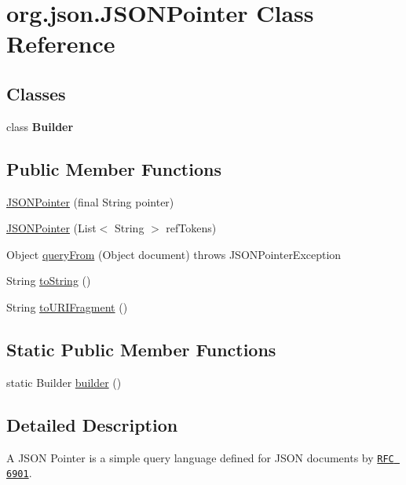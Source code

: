 \hypertarget{classorg_1_1json_1_1JSONPointer}{\section{org.\-json.\-J\-S\-O\-N\-Pointer Class Reference}
\label{classorg_1_1json_1_1JSONPointer}
}
\subsection*{Classes}
\begin{DoxyCompactItemize}
\item 
class {\bfseries Builder}
\end{DoxyCompactItemize}
\subsection*{Public Member Functions}
\begin{DoxyCompactItemize}
\item 
\hyperlink{classorg_1_1json_1_1JSONPointer_a00cf217b565e93e96db4b9e72a5ffd2c}{J\-S\-O\-N\-Pointer} (final String pointer)
\item 
\hyperlink{classorg_1_1json_1_1JSONPointer_ab6c21c4cfbd63415e3618a428448708b}{J\-S\-O\-N\-Pointer} (List$<$ String $>$ ref\-Tokens)
\item 
Object \hyperlink{classorg_1_1json_1_1JSONPointer_a2de9719db18d0f9551a335877c2c7ef7}{query\-From} (Object document)  throws J\-S\-O\-N\-Pointer\-Exception 
\item 
String \hyperlink{classorg_1_1json_1_1JSONPointer_ae41154af3db8013a5f76a5354c08b5a6}{to\-String} ()
\item 
String \hyperlink{classorg_1_1json_1_1JSONPointer_a9c99fdeb3486aea49aed951269f51eda}{to\-U\-R\-I\-Fragment} ()
\end{DoxyCompactItemize}
\subsection*{Static Public Member Functions}
\begin{DoxyCompactItemize}
\item 
static Builder \hyperlink{classorg_1_1json_1_1JSONPointer_a68e413bf609396942ddc056a964acbd5}{builder} ()
\end{DoxyCompactItemize}


\subsection{Detailed Description}
A J\-S\-O\-N Pointer is a simple query language defined for J\-S\-O\-N documents by \href{https://tools.ietf.org/html/rfc6901}{\tt R\-F\-C 6901}.

